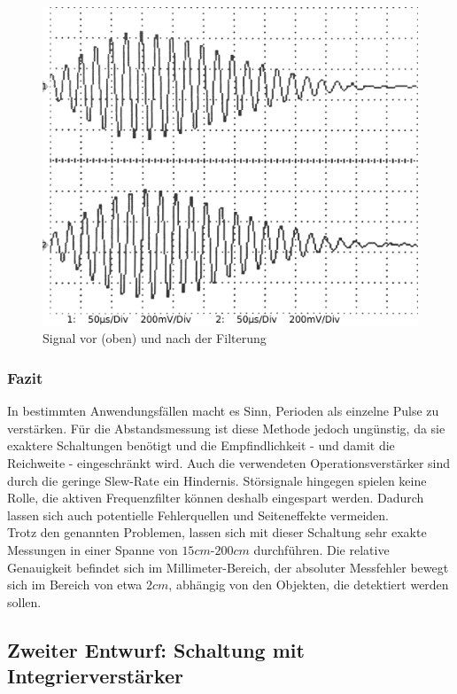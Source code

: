 \begin{figure}[H]
\centering
\includegraphics[width=(\textwidth), angle=0]{oszi/15-04-23/3_01.png}
\caption{Signal vor (oben) und nach der Filterung} \label{img:I10}
\end{figure}

\subsubsection{Fazit}
In bestimmten Anwendungsfällen macht es Sinn, Perioden als einzelne Pulse zu verstärken. Für die Abstandsmessung ist diese Methode jedoch ungünstig, da sie exaktere Schaltungen benötigt und die Empfindlichkeit - und damit die Reichweite - eingeschränkt wird. Auch die verwendeten Operationsverstärker sind durch die geringe Slew-Rate ein Hindernis. Störsignale hingegen spielen keine Rolle, die aktiven Frequenzfilter können deshalb eingespart werden. Dadurch lassen sich auch potentielle Fehlerquellen und Seiteneffekte vermeiden.\\
Trotz den genannten Problemen, lassen sich mit dieser Schaltung sehr exakte Messungen in einer Spanne von $15cm$-$200cm$ durchführen. Die relative Genauigkeit befindet sich im Millimeter-Bereich, der absoluter Messfehler bewegt sich im Bereich von etwa $2cm$, abhängig von den Objekten, die detektiert werden sollen.



\subsection{Zweiter Entwurf: Schaltung mit Integrierverstärker} \label{schaltung:integrator}

